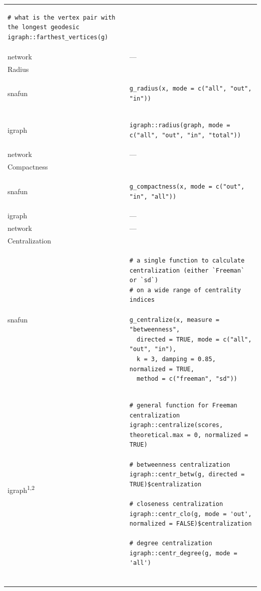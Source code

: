 \documentclass[
]{article}
\begin{document}
\begin{longtable}{ll}
\begin{verbatim}
# what is the vertex pair with the longest geodesic
igraph::farthest_vertices(g)
\end{verbatim} \\ 
network & — \\ 
\midrule
\multicolumn{1}{l}{Radius} \\ 
\midrule
snafun & \begin{verbatim}
g_radius(x, mode = c("all", "out", "in"))
\end{verbatim} \\ 
igraph & \begin{verbatim}
igraph::radius(graph, mode = c("all", "out", "in", "total"))
\end{verbatim} \\ 
network & — \\ 
\midrule
\multicolumn{1}{l}{Compactness} \\ 
\midrule
snafun & \begin{verbatim}
g_compactness(x, mode = c("out", "in", "all"))
\end{verbatim} \\ 
igraph & — \\ 
network & — \\ 
\midrule
\multicolumn{1}{l}{Centralization} \\ 
\midrule
snafun & \begin{verbatim}
# a single function to calculate centralization (either `Freeman` or `sd`) 
# on a wide range of centrality indices

g_centralize(x, measure = "betweenness",
  directed = TRUE, mode = c("all", "out", "in"), 
  k = 3, damping = 0.85, normalized = TRUE, 
  method = c("freeman", "sd"))
\end{verbatim} \\ 
igraph\textsuperscript{1,2} & \begin{verbatim}
# general function for Freeman centralization
igraph::centralize(scores, theoretical.max = 0, normalized = TRUE)

# betweenness centralization
igraph::centr_betw(g, directed = TRUE)$centralization

# closeness centralization
igraph::centr_clo(g, mode = 'out', normalized = FALSE)$centralization

# degree centralization
igraph::centr_degree(g, mode = 'all')


\end{verbatim}
\end{longtable}
\end{document}
